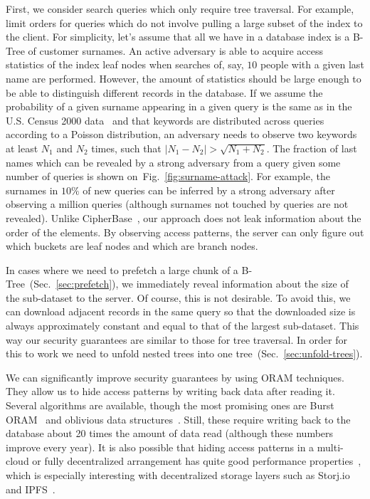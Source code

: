 \documentclass[notitlepage,longbibliography]{revtex4-1}
\newcommand{\figref}[1]{Fig.~\ref{#1}}
\begin{document}
First, we consider search queries which only require tree traversal.
For example, limit orders for queries which do not involve pulling a large subset of the index to the client.
For simplicity, let's assume that all we have in a database index is a B-Tree of customer surnames.
An active adversary is able to acquire access statistics of the index leaf nodes when searches of, say, $10$ people with a given last name are performed.
However, the amount of statistics should be large enough to be able to distinguish different records in the database.
If we assume the probability of a given surname appearing in a given query is the same as in the U.S. Census 2000 data~\cite{us-census-surnames}
and that keywords are distributed across queries according to a Poisson distribution,
an adversary needs to observe two keywords at least $N_1$ and $N_2$ times, such that $|N_1 - N_2| > \sqrt{N_1 + N_2}$.
The fraction of last names which can be revealed by a strong adversary from a query given some number of queries is shown on~\figref{fig:surname-attack}.
For example, the surnames in $10\%$ of new queries can be inferred by a strong adversary after observing a million queries (although surnames not touched by queries are not revealed).
Unlike CipherBase~\cite{cipherbase}, our approach does not leak information about the order of the elements.
By observing access patterns, the server can only figure out which buckets are leaf nodes and which are branch nodes.

In cases where we need to prefetch a large chunk of a B-Tree~(Sec.~\ref{sec:prefetch}), we immediately reveal information about the size of the sub-dataset to the server.
Of course, this is not desirable.
To avoid this, we can download adjacent records in the same query so that the downloaded size is always approximately constant and equal to that of the largest sub-dataset.
This way our security guarantees are similar to those for tree traversal.
In order for this to work we need to unfold nested trees into one tree~(Sec.~\ref{sec:unfold-trees}).

We can significantly improve security guarantees by using ORAM techniques.
They allow us to hide access patterns by writing back data after reading it.
Several algorithms are available, though the most promising ones are Burst ORAM~\cite{burst-oram}
and oblivious data structures~\cite{ods-wang-2014}.
Still, these require writing back to the database about 20 times the amount of data read
(although these numbers improve every year).
It is also possible that hiding access patterns in a multi-cloud or fully decentralized arrangement has quite good performance properties~\cite{oram-multicloud},
which is especially interesting with decentralized storage layers such as Storj.io~\cite{storj} and IPFS~\cite{ipfs}.
\end{document}
